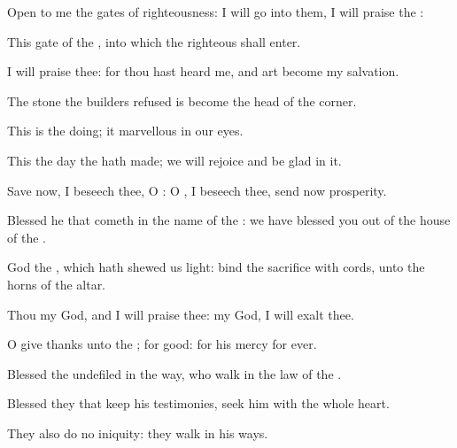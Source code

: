 {\Q {}Open to me the
gates of
righteousness: I will
go into them,
{} I will
praise the
{}:


\par }{\Q {}This
gate of the
{}, into which the
righteous shall
enter.


\par }{\Q {}I will
praise thee: for thou hast
heard me, and art become my
salvation.


\par }{\Q {}The
stone
{} the
builders
refused is become the
head
{} of the
corner.


\par }{\Q {}This is the
{} doing; it
{}
marvellous in our
eyes.


\par }{\Q {}This
{} the
day
{} the
{} hath
made; we will
rejoice and be
glad in it.


\par }{\Q {}Save now, I
beseech thee, O
{}: O
{}, I
beseech thee, send now
prosperity.


\par }{\Q {}Blessed
{} he that
cometh in the
name of the
{}: we have
blessed you out of the
house of the
{}.


\par }{\Q {}God
{} the
{}, which hath shewed us
light:
bind the
sacrifice with
cords,
{} unto the
horns of the
altar.


\par }{\Q {}Thou
{} my
God, and I will
praise thee:
{} my
God, I will
exalt thee.


\par }{\Q {}O give
thanks unto the
{}; for
{}
good: for his
mercy
{} for
ever.




\par }
{\Q {}Blessed
{} the
undefiled in the
way, who
walk in the
law of the
{}.


\par }{\Q {}Blessed
{} they that
keep his
testimonies,
{}
seek him with the whole
heart.


\par }{\Q {}They also
do no
iniquity: they
walk in his
ways.


\par }{\BB \par }
